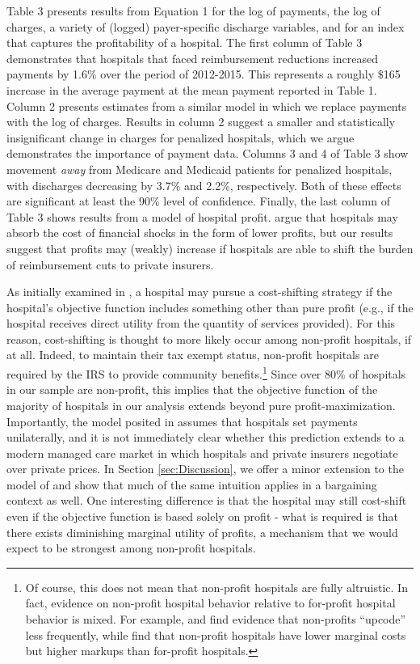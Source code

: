 \documentclass[12pt]{article}
\begin{document}
Table 3 presents results from Equation 1 for the log of payments, the log of charges, a variety of (logged) payer-specific discharge variables, and for an index that captures the profitability of a hospital.  The first column of Table 3 demonstrates that hospitals that faced reimbursement reductions increased payments by 1.6$\%$ over the period of 2012-2015.  This represents a roughly $\$$165 increase in the average payment at the mean payment reported in Table 1.  Column 2 presents estimates from a similar model in which we replace payments with the log of charges.  Results in column 2 suggest a smaller and statistically insignificant change in charges for penalized hospitals, which we argue demonstrates the importance of payment data.  Columns 3 and 4 of Table 3 show movement \textit{away} from Medicare and Medicaid patients for penalized hospitals, with discharges decreasing by 3.7$\%$ and 2.2$\%$, respectively.  Both of these effects are significant at least the 90$\%$ level of confidence.  Finally, the last column of Table 3 shows results from a model of hospital profit.  \citet{dranove2017} argue that hospitals may absorb the cost of financial shocks in the form of lower profits, but our results suggest that profits may (weakly) increase if hospitals are able to shift the burden of reimbursement cuts to private insurers.  

As initially examined in \cite{dranove1988}, a hospital may pursue a cost-shifting strategy if the hospital's objective function includes something other than pure profit (e.g., if the hospital receives direct utility from the quantity of services provided). For this reason, cost-shifting is thought to more likely occur among non-profit hospitals, if at all. Indeed, to maintain their tax exempt status, non-profit hospitals are required by the IRS to provide community benefits.\footnote{Of course, this does not mean that non-profit hospitals are fully altruistic. In fact, evidence on non-profit hospital behavior relative to for-profit hospital behavior is mixed. For example, \cite{silverman2004} and \cite{dafny2005} find evidence that non-profits ``upcode'' less frequently, while \cite{gaynor2003} find that non-profit hospitals have lower marginal costs but higher markups than for-profit hospitals.} Since over 80$\%$ of hospitals in our sample are non-profit, this implies that the objective function of the majority of hospitals in our analysis extends beyond pure profit-maximization.  Importantly, the model posited in \cite{dranove1988} assumes that hospitals set payments unilaterally, and it is not immediately clear whether this prediction extends to a modern managed care market in which hospitals and private insurers negotiate over private prices. In Section \ref{sec:Discussion}, we offer a minor extension to the model of \cite{dranove1988} and show that much of the same intuition applies in a bargaining context as well. One interesting difference is that the hospital may still cost-shift even if the objective function is based solely on profit - what is required is that there exists diminishing marginal utility of profits, a mechanism that we would expect to be strongest among non-profit hospitals.
\end{document}
